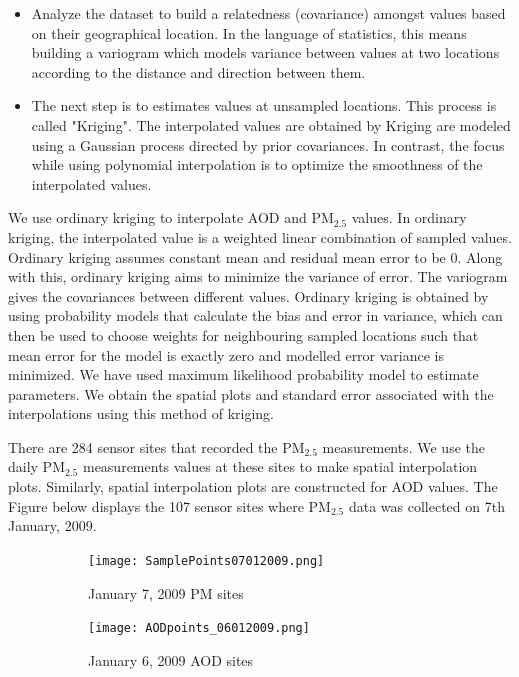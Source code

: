 \documentclass[10pt]{article}
\begin{document}
\begin{itemize}
\item Analyze the dataset to build a relatedness (covariance) amongst values based on their geographical location. In the language of statistics, this means building a variogram which models variance between values at two locations according to the distance and direction between them.
\item The next step is to estimates values at unsampled locations. This process is called "Kriging". The interpolated values are obtained by Kriging are modeled using a Gaussian process directed by prior covariances. In contrast, the focus while using polynomial interpolation is to optimize the smoothness of the interpolated values.
\end{itemize}

We use ordinary kriging to interpolate AOD and PM$_{2.5}$ values. In ordinary kriging, the interpolated value is a weighted linear combination of sampled values. Ordinary kriging assumes constant mean and  residual mean error to be 0. Along with this, ordinary kriging aims to minimize the variance of error. The variogram gives the covariances between different values. Ordinary kriging is obtained by using probability models that calculate the bias and error in variance, which can then be used to choose weights for neighbouring sampled locations such that mean error for the model is exactly zero and modelled error variance is minimized. We have used maximum likelihood probability model to estimate parameters. We obtain the spatial plots and standard error associated with  the interpolations using this method of kriging. 

There are 284 sensor sites that recorded the PM$_{2.5}$ measurements. We use the daily  PM$_{2.5}$ measurements values at these sites to make spatial interpolation plots. Similarly, spatial interpolation plots are constructed for AOD values. The Figure below displays the 107 sensor sites where PM$_{2.5}$ data was collected on 7th January, 2009. 

\begin{figure}[H]
\centering
\begin{subfigure}{.5\textwidth}
  \centering
  \texttt{[image: SamplePoints07012009.png]}
  \caption{January 7, 2009 PM sites}
\end{subfigure}%
\begin{subfigure}{.5\textwidth}
  \centering
  \texttt{[image: AODpoints\_06012009.png]}
  \caption{January 6, 2009 AOD sites}
\end{subfigure}
\caption{}
\label{f}
\end{figure}
\end{document}
